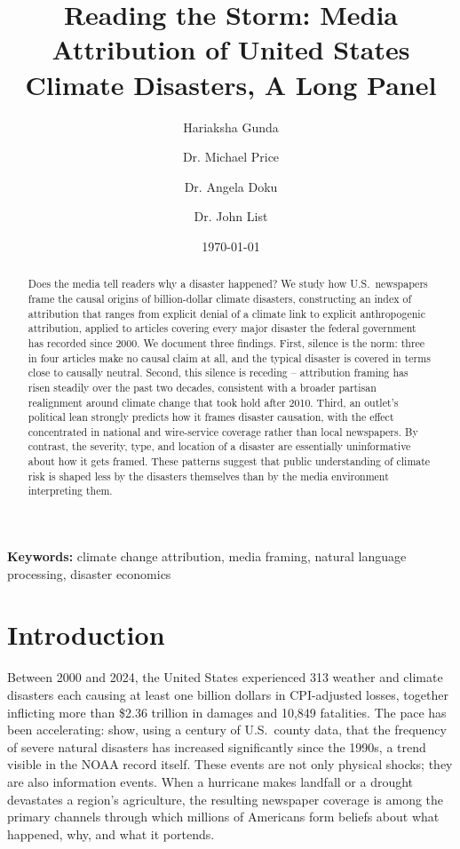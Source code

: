 \documentclass[12pt]{article}
\title{Reading the Storm: Media Attribution of United States Climate Disasters, A Long Panel}
\author[1]{Hariaksha Gunda}
\author[2]{Dr. Michael Price}
\author[3]{Dr. Angela Doku}
\author[4]{Dr. John List}
\affil[1]{University of Alabama}
\affil[2]{University of Alabama}
\affil[3]{University of Toronto}
\affil[4]{University of Chicago}
\date{\today}
\begin{document}
\maketitle

\begin{abstract}
\begin{sloppypar}
Does the media tell readers why a disaster happened? We study how
U.S.\ newspapers frame the causal origins of billion-dollar climate
disasters, constructing an index of attribution that ranges from
explicit denial of a climate link to explicit anthropogenic
attribution, applied to articles covering every major disaster the
federal government has recorded since 2000. We document three
findings. First, silence is the norm: three in four articles make no
causal claim at all, and the typical disaster is covered in terms
close to causally neutral. Second, this silence is receding --
attribution framing has risen steadily over the past two decades,
consistent with a broader partisan realignment around climate change
that took hold after 2010. Third, an outlet's political lean strongly
predicts how it frames disaster causation, with the effect concentrated
in national and wire-service coverage rather than local newspapers.
By contrast, the severity, type, and location of a disaster are
essentially uninformative about how it gets framed. These patterns
suggest that public understanding of climate risk is shaped less by
the disasters themselves than by the media environment interpreting
them.
\end{sloppypar}
\end{abstract}

\noindent \textbf{Keywords:} climate change attribution, media framing,
natural language processing, disaster economics

\newpage


\section{Introduction}

Between 2000 and 2024, the United States experienced 313 weather and
climate disasters each causing at least one billion dollars in
CPI-adjusted losses, together inflicting more than \$2.36 trillion in
damages and 10,849 fatalities.  The pace has been accelerating:
\citet{boustan2020} show, using a century of U.S.\ county data, that
the frequency of severe natural disasters has increased significantly
since the 1990s, a trend visible in the NOAA record itself.  These
events are not only physical shocks; they are also information events.
When a hurricane makes landfall or a drought devastates a region's
agriculture, the resulting newspaper coverage is among the primary
channels through which millions of Americans form beliefs about what
happened, why, and what it portends.
\end{document}
